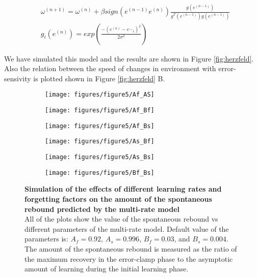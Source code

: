 \documentclass[9pt,twocolumn]{paper-template}
\begin{document}
\begin{eqnarray*}
& \omega^{(n+1)} = \omega^{(n)}+\beta sign(e^{(n-1)}e^{(n)}) \frac{g(e^{(n-1)})}{g^T(e^{(n-1)})g(e^{(n-1)})}\\
&g_i(e^{(n)}) = exp(\frac{-(e^{(n)}-{e^\smallsmile}_i)^2}{2\sigma^2})
\end{eqnarray*}

We have simulated this model and the results are shown in Figure \ref{fig:herzfeld}. Also the relation between the speed of changes in environment with error-sensivity is plotted shown in Figure \ref{fig:herzfeld} B. 

\begin{figure}[h!]
  \centering
  \begin{subfigure}[b]{0.32\linewidth}
    \texttt{[image: figures/figure5/Af\_AS]}
  \end{subfigure}
  \begin{subfigure}[b]{0.32\linewidth}
    \texttt{[image: figures/figure5/Af\_Bf]}
  \end{subfigure}
   \begin{subfigure}[b]{0.32\linewidth}
    \texttt{[image: figures/figure5/Af\_Bs]}
  \end{subfigure}
    \begin{subfigure}[b]{0.32\linewidth}
    \texttt{[image: figures/figure5/As\_Bf]}
  \end{subfigure}
  \begin{subfigure}[b]{0.32\linewidth}
    \texttt{[image: figures/figure5/As\_Bs]}
  \end{subfigure}
   \begin{subfigure}[b]{0.32\linewidth}
    \texttt{[image: figures/figure5/Bf\_Bs]}
  \end{subfigure}
  \caption{\textbf{Simulation of the effects of different learning rates and forgetting factors on the amount of the spontaneous rebound predicted by the multi-rate model}\\
 All of the plots show the value of the spontaneous rebound vs different parameters of the multi-rate model. Default value of the parameters is: $A_f=0.92$, $A_s=0.996$, $B_f=0.03$, and $B_s=0.004$. The amount of the spontaneous rebound is measured as the ratio of the maximum recovery in the error-clamp phase to the asymptotic amount of learning during the initial learning phase. 
}
  \label{fig:mutli_rate_params}
\end{figure}
\end{document}
